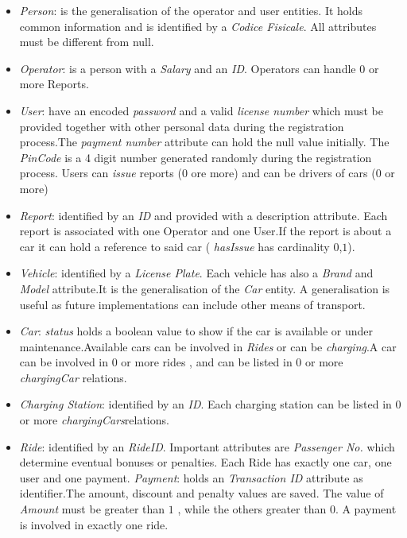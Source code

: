 \begin{itemize}
\item \textit{Person}: is the generalisation of the operator and user entities. 
It holds common information and is identified by a \emph{Codice Fisicale}. All attributes must be different from null.
\item \textit{Operator}: is a person with a \emph{Salary} and an \emph{ID}. Operators can handle $0$ or more Reports.
\item \textit{User}: have an encoded \emph{password} and a valid \emph{license number} which must be provided together with other personal data during the registration process.The \emph{payment number} attribute can hold the null value initially. The \emph{PinCode} is a 4 digit number generated randomly during the registration process. Users can \emph{issue} reports ($0$ ore more) and can be drivers of cars ($0$ or more)
\item \textit{Report}: identified by an \emph{ID} and provided with a description attribute. Each report is associated with one Operator and one User.If the report is about a car it can hold a reference to said car ( \emph{hasIssue} has cardinality $0$,$1$).
\item \textit{Vehicle}: identified by a \emph{License Plate}. Each vehicle has also
a \emph{Brand} and \emph{Model} attribute.It is the generalisation of the \emph{Car} entity. A generalisation is useful as future implementations can include other means of transport.
\item \textit{Car}: \emph{status} holds a boolean value to show if the car is available or under maintenance.Available cars can be involved in \emph{Rides} or can be \emph{charging}.A car can be involved in $0$ or more rides , and can be listed in $0$ or more \emph{chargingCar } relations.
\item \textit{Charging Station}: identified by an \emph{ID}. Each charging station can be listed in $0$ or more \emph{chargingCars}relations.
\item \textit{Ride}: identified by an \emph{RideID}. Important attributes are \emph{Passenger No.} which determine eventual bonuses or penalties. Each Ride has exactly one car, one user and one payment.
\emph{Payment}: holds an \emph{Transaction ID} attribute as identifier.The amount, discount and penalty values are saved. The value of \emph{Amount} must be greater than $1$ , while the others greater than $0$. A payment is involved in exactly one ride.
\end{itemize}
\newpage